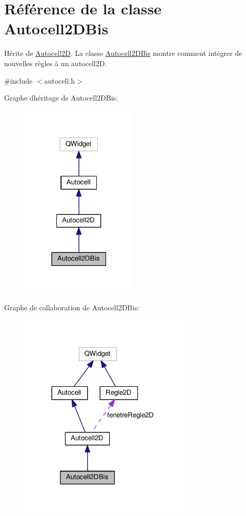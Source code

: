 \hypertarget{class_autocell2_d_bis}{}\section{Référence de la classe Autocell2\+D\+Bis}
\label{class_autocell2_d_bis}


Hérite de \hyperlink{class_autocell2_d}{Autocell2D}. La classe \hyperlink{class_autocell2_d_bis}{Autocell2\+D\+Bis} montre comment intégrer de nouvelles règles à un autocell2D.  




{\ttfamily \#include $<$autocell.\+h$>$}



Graphe d\textquotesingle{}héritage de Autocell2\+D\+Bis\+:\nopagebreak
\begin{figure}[H]
\begin{center}
\leavevmode
\includegraphics[width=159pt]{class_autocell2_d_bis__inherit__graph}
\end{center}
\end{figure}


Graphe de collaboration de Autocell2\+D\+Bis\+:\nopagebreak
\begin{figure}[H]
\begin{center}
\leavevmode
\includegraphics[width=230pt]{class_autocell2_d_bis__coll__graph}
\end{center}
\end{figure}
